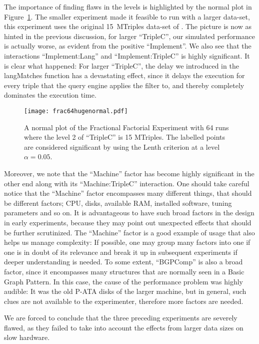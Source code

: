 \documentclass{llncs}
\begin{document}
The importance of finding flaws in the levels is highlighted by the
normal plot in Figure~\ref{fig:frac64hugenormal}. The smaller
experiment made it feasible to run with a larger data-set, this
experiment uses the original 15~MTriples data-set of
\cite{mxro:Morsey2011DBpedia}. The picture is now as hinted in the
previous discussion, for larger ``TripleC'', our simulated performance
is actually worse, as evident from the positive ``Implement''. We also
see that the interactions ``Implement:Lang'' and ``Implement:TripleC''
is highly significant. It is clear what happened: For larger
``TripleC'', the delay we introduced in the langMatches function has a
devastating effect, since it delays the execution for every triple
that the query engine applies the filter to, and thereby completely
dominates the execution time.

\begin{figure}[h!]
  \texttt{[image: frac64hugenormal.pdf]}
  \caption{A normal plot of the Fractional Factorial Experiment with
    64 runs where the level 2 of ``TripleC'' is 15 MTriples. The
    labelled points are considered significant by using the Lenth
    criterion at a level $\alpha=0.05$.}\label{fig:frac64hugenormal}
\end{figure}


Moreover, we note that the ``Machine'' factor has become highly
significant in the other end along with its ``Machine:TripleC''
interaction. One should take careful notice that the ``Machine''
factor encompasses many different things, that should be different
factors; CPU, disks, available RAM, installed software, tuning
parameters and so on. It is advantageous to have such broad factors in
the design in early experiments, because they may point out unexpected
effects that should be further scrutinized. The ``Machine'' factor is
a good example of usage that also helps us manage complexity: If
possible, one may group many factors into one if one is in doubt of
its relevance and break it up in subsequent experiments if deeper
understanding is needed. To some extent, ``BGPComp'' is also a broad
factor, since it encompasses many structures that are normally seen in
a Basic Graph Pattern. In this case, the cause of the performance
problem was highly audible: It was the old P-ATA disks of the larger
machine, but in general, such clues are not available to the
experimenter, therefore more factors are needed.

We are forced to conclude that the three preceding experiments are
severely flawed, as they failed to take into account the effects from
larger data sizes on slow hardware.
\end{document}
